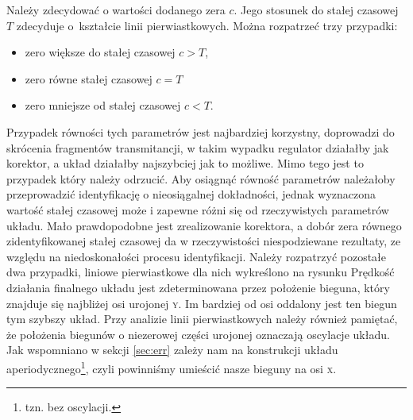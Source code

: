 \documentclass[11pt]{article}
\begin{document}
Należy zdecydować o wartości dodanego zera $ c $. Jego stosunek do stałej czasowej $ T $ zdecyduje o~kształcie linii pierwiastkowych.
Można rozpatrzeć trzy przypadki:
\begin{itemize}
	\item zero większe do stałej czasowej $ c > T $,
	\item zero równe stałej czasowej $ c = T $
	\item zero mniejsze od stałej czasowej $ c < T $.
\end{itemize}
Przypadek równości tych parametrów jest najbardziej korzystny, doprowadzi do skrócenia fragmentów transmitancji, w takim wypadku regulator działałby jak korektor, a układ działałby najszybciej jak to możliwe.
Mimo tego jest to przypadek który należy odrzucić.
Aby osiągnąć równość parametrów należałoby przeprowadzić identyfikację o nieosiągalnej dokładności, jednak wyznaczona wartość stałej czasowej może i zapewne różni się od rzeczywistych parametrów układu.
Mało prawdopodobne jest zrealizowanie korektora, a dobór zera równego zidentyfikowanej stałej czasowej da w rzeczywistości niespodziewane rezultaty, ze względu na niedoskonałości procesu identyfikacji.
Należy rozpatrzyć pozostałe dwa przypadki, liniowe pierwiastkowe dla nich wykreślono na rysunku %
Prędkość działania finalnego układu jest zdeterminowana przez położenie bieguna, który znajduje się najbliżej osi urojonej \textsc{y}.
Im bardziej od osi oddalony jest ten biegun tym szybszy układ.
Przy analizie linii pierwiastkowych należy również pamiętać, że położenia biegunów o niezerowej części urojonej oznaczają oscylacje układu.
Jak wspomniano w sekcji \ref{sec:err} zależy nam na konstrukcji układu aperiodycznego\footnote{tzn. bez oscylacji.}, czyli powinniśmy umieścić nasze bieguny na osi \textsc{x}.
\end{document}
